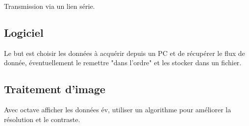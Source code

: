 \documentclass[10pt,a4paper]{article}
\begin{document}
Transmission via un lien série.


\subsection*{Logiciel}

Le but est choisir les données à acquérir depuis un PC et de récupérer le flux de donnée, éventuellement le remettre "dans l'ordre" et les stocker dans un fichier.

\subsection*{Traitement d'image}

Avec octave afficher les données év, utiliser un algorithme pour améliorer la résolution et le contraste.

\end{document}
